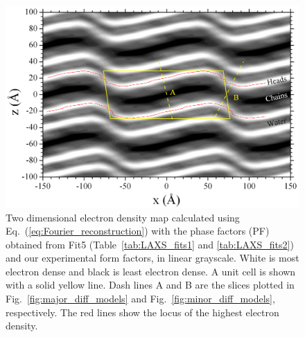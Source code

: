 \begin{landscape}
\begin{figure}[htbp]
  \centering
  \includegraphics[width=0.85\linewidth]{figures/ripple/LAXS/Fit5_2D_edp}
  \caption[Two dimensional electron density map calculated using 
  Eq.~(\ref{eq:Fourier_reconstruction}) with the phase factors (PF) obtained 
  from Fit5 (Table~\ref{tab:LAXS_fits1} and \ref{tab:LAXS_fits2}) and our 
  experimental form factors, in linear grayscale]
  {Two dimensional electron density map calculated using 
  Eq.~(\ref{eq:Fourier_reconstruction}) with the phase factors (\acs{PF}) obtained 
  from Fit5 (Table~\ref{tab:LAXS_fits1} and \ref{tab:LAXS_fits2}) and our 
  experimental form factors, in linear grayscale. 
  White is most electron dense and black is least electron dense. 
  A unit cell is shown with a solid yellow line. 
  Dash lines A and B are the slices plotted in  Fig.~\ref{fig:major_diff_models} 
  and Fig.~\ref{fig:minor_diff_models}, respectively.
  The red lines show the locus of the highest electron density.}
  \label{fig:Fit5_2D_edp}
\end{figure}
\end{landscape}

